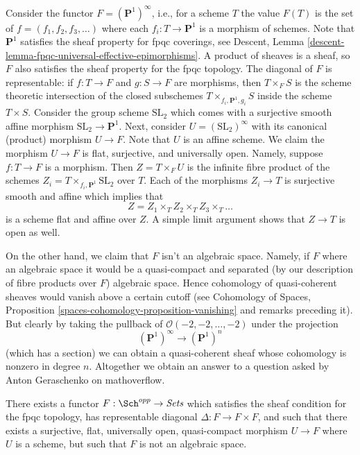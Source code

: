 \noindent
Consider the functor $F = (\mathbf{P}^1)^\infty$, i.e., for a scheme $T$
the value $F(T)$ is the set of $f = (f_1, f_2, f_3, \ldots)$ where each
$f_i : T \to \mathbf{P}^1$ is a morphism of schemes. Note that
$\mathbf{P}^1$ satisfies the sheaf property for fpqc coverings, see
Descent, Lemma \ref{descent-lemma-fpqc-universal-effective-epimorphisms}.
A product of sheaves is a sheaf, so $F$ also satisfies the sheaf property for
the fpqc topology. The diagonal of $F$ is representable: if $f : T \to F$
and $g : S \to F$ are morphisms, then $T \times_F S$ is the scheme theoretic
intersection of the closed subschemes $T \times_{f_i, \mathbf{P}^1, g_i} S$
inside the scheme $T \times S$. Consider the group scheme $\text{SL}_2$ which
comes with a surjective smooth affine morphism $\text{SL}_2 \to \mathbf{P}^1$.
Next, consider $U = (\text{SL}_2)^\infty$ with its canonical (product) morphism
$U \to F$. Note that $U$ is an affine scheme. We claim the morphism
$U \to F$ is flat, surjective, and universally open. Namely, suppose
$f : T \to F$ is a morphism. Then $Z = T \times_F U$ is the infinite
fibre product of the schemes $Z_i = T \times_{f_i, \mathbf{P}^1} \text{SL}_2$
over $T$. Each of the morphisms $Z_i \to T$ is surjective smooth and
affine which implies that
$$
Z = Z_1 \times_T Z_2 \times_T Z_3 \times_T \ldots
$$
is a scheme flat and affine over $Z$. A simple limit argument shows that
$Z \to T$ is open as well.

\medskip\noindent
On the other hand, we claim that $F$ isn't an algebraic space.
Namely, if $F$ where an algebraic space it would be a quasi-compact
and separated (by our description of fibre products over $F$) algebraic
space. Hence cohomology of quasi-coherent sheaves would vanish above a
certain cutoff (see
Cohomology of Spaces, Proposition \ref{spaces-cohomology-proposition-vanishing}
and remarks preceding it). But clearly by taking the pullback
of $\mathcal{O}(-2, -2, \ldots, -2)$ under the projection
$$
(\mathbf{P}^1)^\infty \longrightarrow (\mathbf{P}^1)^n
$$
(which has a section) we can obtain a quasi-coherent sheaf whose cohomology
is nonzero in degree $n$. Altogether we obtain an answer to a question asked
by Anton Geraschenko on mathoverflow.

\begin{lemma}
\label{lemma-not-algebraic}
There exists a functor $F : \Sch^{opp} \to \textit{Sets}$
which satisfies the sheaf condition for the fpqc topology, has representable
diagonal $\Delta : F \to F \times F$, and such that there exists a
surjective, flat, universally open, quasi-compact morphism
$U \to F$ where $U$ is a scheme, but such that $F$ is not an algebraic space.
\end{lemma}

